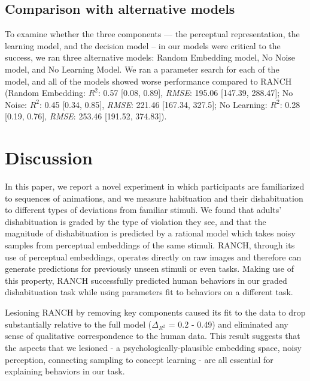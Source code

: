 \documentclass[10pt, letterpaper]{article}
\begin{document}
\hypertarget{comparison-with-alternative-models}{%
\subsection{Comparison with alternative
models}\label{comparison-with-alternative-models}}

To examine whether the three components --- the perceptual
representation, the learning model, and the decision model -- in our
models were critical to the success, we ran three alternative models:
Random Embedding model, No Noise model, and No Learning Model. We ran a
parameter search for each of the model, and all of the models showed
worse performance compared to RANCH (Random Embedding: \(R^2\): 0.57
{[}0.08, 0.89{]}, \emph{RMSE}: 195.06 {[}147.39, 288.47{]}; No Noise:
\(R^2\): 0.45 {[}0.34, 0.85{]}, \emph{RMSE}: 221.46 {[}167.34, 327.5{]};
No Learning: \(R^2\): 0.28 {[}0.19, 0.76{]}, \emph{RMSE}: 253.46
{[}191.52, 374.83{]}).

\hypertarget{discussion}{%
\section{Discussion}\label{discussion}}

In this paper, we report a novel experiment in which participants are
familiarized to sequences of animations, and we measure habituation and
their dishabituation to different types of deviations from familiar
stimuli. We found that adults' dishabituation is graded by the type of
violation they see, and that the magnitude of dishabituation is
predicted by a rational model which takes noisy samples from perceptual
embeddings of the same stimuli. RANCH, through its use of perceptual
embeddings, operates directly on raw images and therefore can generate
predictions for previously unseen stimuli or even tasks. Making use of
this property, RANCH successfully predicted human behaviors in our
graded dishabituation task while using parameters fit to behaviors on a
different task.

Lesioning RANCH by removing key components caused its fit to the data to
drop substantially relative to the full model (\(\Delta_{R^2}\) = 0.2 -
0.49) and eliminated any sense of qualitative correspondence to the
human data. This result suggests that the aspects that we lesioned - a
psychologically-plausible embedding space, noisy perception, connecting
sampling to concept learning - are all essential for explaining
behaviors in our task.
\end{document}
